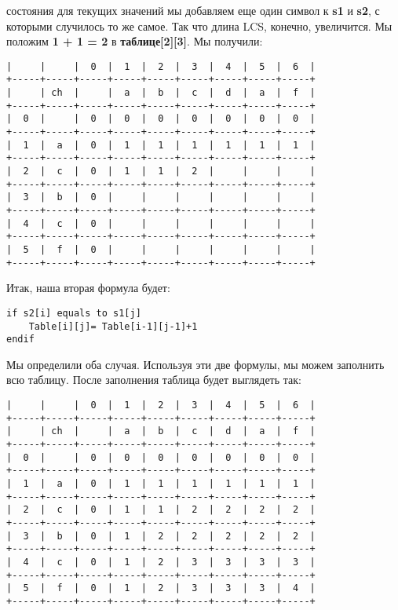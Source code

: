 состояния для текущих значений мы добавляем еще один символ к \textbf{s1} и \textbf{s2}, с
которыми случилось то же самое. Так что длина LCS, конечно, увеличится.
Мы положим \textbf{1 + 1 = 2} в \textbf{таблице[2][3]}. Мы получили:
\vspace{\baselineskip}
\begin{tcolorbox}
\begin{verbatim}
|     |     |  0  |  1  |  2  |  3  |  4  |  5  |  6  |
+-----+-----+-----+-----+-----+-----+-----+-----+-----+
|     | ch  |     |  a  |  b  |  c  |  d  |  a  |  f  |
+-----+-----+-----+-----+-----+-----+-----+-----+-----+
|  0  |     |  0  |  0  |  0  |  0  |  0  |  0  |  0  |
+-----+-----+-----+-----+-----+-----+-----+-----+-----+
|  1  |  a  |  0  |  1  |  1  |  1  |  1  |  1  |  1  |
+-----+-----+-----+-----+-----+-----+-----+-----+-----+
|  2  |  c  |  0  |  1  |  1  |  2  |     |     |     |
+-----+-----+-----+-----+-----+-----+-----+-----+-----+
|  3  |  b  |  0  |     |     |     |     |     |     |
+-----+-----+-----+-----+-----+-----+-----+-----+-----+
|  4  |  c  |  0  |     |     |     |     |     |     |
+-----+-----+-----+-----+-----+-----+-----+-----+-----+
|  5  |  f  |  0  |     |     |     |     |     |     |
+-----+-----+-----+-----+-----+-----+-----+-----+-----+
\end{verbatim}
\end{tcolorbox}
\vspace{\baselineskip}
Итак, наша вторая формула будет:
\begin{tcolorbox}
\begin{verbatim}     
if s2[i] equals to s1[j]
    Table[i][j]= Table[i-1][j-1]+1
endif
\end{verbatim}
\end{tcolorbox}
\vspace{\baselineskip}
Мы определили оба случая. Используя эти две формулы, мы можем
заполнить всю таблицу. После заполнения таблица будет выглядеть так:
\vspace{\baselineskip}
\begin{tcolorbox}
\begin{verbatim}
|     |     |  0  |  1  |  2  |  3  |  4  |  5  |  6  |
+-----+-----+-----+-----+-----+-----+-----+-----+-----+
|     | ch  |     |  a  |  b  |  c  |  d  |  a  |  f  |
+-----+-----+-----+-----+-----+-----+-----+-----+-----+
|  0  |     |  0  |  0  |  0  |  0  |  0  |  0  |  0  |
+-----+-----+-----+-----+-----+-----+-----+-----+-----+
|  1  |  a  |  0  |  1  |  1  |  1  |  1  |  1  |  1  |
+-----+-----+-----+-----+-----+-----+-----+-----+-----+
|  2  |  c  |  0  |  1  |  1  |  2  |  2  |  2  |  2  |
+-----+-----+-----+-----+-----+-----+-----+-----+-----+
|  3  |  b  |  0  |  1  |  2  |  2  |  2  |  2  |  2  |
+-----+-----+-----+-----+-----+-----+-----+-----+-----+
|  4  |  c  |  0  |  1  |  2  |  3  |  3  |  3  |  3  |
+-----+-----+-----+-----+-----+-----+-----+-----+-----+
|  5  |  f  |  0  |  1  |  2  |  3  |  3  |  3  |  4  |
+-----+-----+-----+-----+-----+-----+-----+-----+-----+
\end{verbatim}
\end{tcolorbox}
